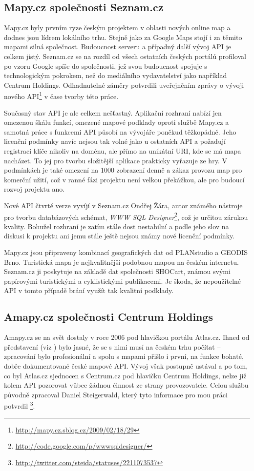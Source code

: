 \subsection{Mapy.cz společnosti Seznam.cz}
Mapy.cz byly prvním ryze českým projektem v oblasti nových online map
a dodnes jsou lídrem lokálního trhu. Stejně jako za Google Maps stojí
i za těmito mapami silná společnost. Budoucnost serveru a případný
další vývoj API je celkem jistý. Seznam.cz se na rozdíl od všech
ostatních českých portálů profiloval po vzoru Google spíše do
společnosti, jež svou budoucnost spojuje s technologickým pokrokem,
než do mediálního vydavatelství jako například Centrum Holdings.
Odhadnutelné záměry potvrdili uveřejněním zprávy o vývoji nového
API\footnote{\url{http://mapy.cz.sblog.cz/2009/02/18/29}} v čase
tvorby této práce.

Současný stav API je ale celkem nešťastný. Aplikační rozhraní nabízí
jen omezenou škálu funkcí, omezené mapové podklady oproti službě
Mapy.cz a samotná práce s funkcemi API působí na vývojáře poněkud
těžkopádně. Jeho licenční podmínky navíc nejsou tak volné jako u
ostatních API a požadují registraci klíče nikoliv na doménu, ale
přímo na unikátní URI, kde se má mapa nacházet. To jej pro tvorbu
složitější aplikace prakticky vyřazuje ze hry. V podmínkách je také
omezení na 1000 zobrazení denně a zákaz provozu map pro komerční
užití, což v ranné fázi projektu není velkou překážkou, ale pro
budoucí rozvoj projektu ano.

Nové API čtvrté verze vyvíjí v Seznam.cz Ondřej Žára, autor známého
nástroje pro tvorbu databázových schémat, {\it WWW SQL
Designer}\footnote{\url{http://code.google.com/p/wwwsqldesigner/}},
což je určitou zárukou kvality. Bohužel rozhraní je zatím stále dost
nestabilní a podle jeho slov na diskusi k projektu ani jemu stále
ještě nejsou známy nové licenční podmínky.

Mapy.cz jsou připraveny kombinací geografických dat od PLANstudio a
GEODIS Brno. Turistická mapa je nejkvalitnější podobnou mapou na českém
internetu. Seznam.cz ji poskytuje na základě dat společnosti SHOCart,
známou svými papírovými turistickými a cyklistickými publikacemi. Je
škoda, že nepoužitelné API v tomto případě brání využít tak kvalitní
podklady.

\subsection{Amapy.cz společnosti Centrum Holdings}
Amapy.cz se na svět dostaly v roce 2006 pod hlavičkou portálu
Atlas.cz. Ihned od představení (viz \cite{amapy}) bylo jasné, že se s
nimi musí na českém trhu počítat -- zpracování bylo profesionální a spolu s mapami přišlo
i první, na funkce bohaté, dobře dokumentované české mapové API. Vývoj
však postupně ustával a po tom, co byl Atlas.cz sjednocen s
Centrum.cz pod hlavičku Centrum Holdings, nelze již kolem API
pozorovat vůbec žádnou činnost ze strany provozovatele. Celou službu
původně zpracoval Daniel Steigerwald, který tyto informace pro mou
práci potvrdil
\footnote{\url{http://twitter.com/steida/statuses/2211073537}}.

